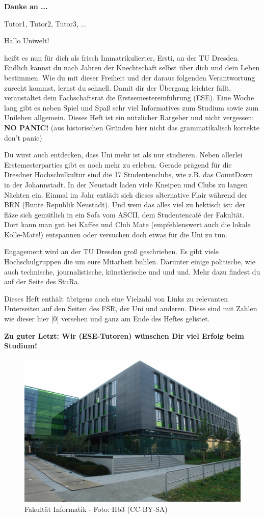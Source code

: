 \textbf{Danke an ...}

Tutor1, Tutor2, Tutor3, ...



Hallo Uniwelt!

heißt es nun für dich als frisch Immatrikulierter, Ersti, an der TU Dresden. 
Endlich kannst du nach Jahren der Knechtschaft selbst über dich und dein Leben bestimmen. 
Wie du mit dieser Freiheit und der daraus folgenden Verantwortung zurecht kommst, lernst du schnell. 
Damit dir der Übergang leichter fällt, veranstaltet dein Fachschaftsrat die Erstsemestereinführung (ESE). 
Eine Woche lang gibt es neben Spiel und Spaß sehr viel Informatives zum Studium sowie zum Unileben allgemein. 
Dieses Heft ist ein nützlicher Ratgeber und nicht vergessen: 
\textbf{NO PANIC!} (aus historischen Gründen hier nicht das grammatikalisch korrekte \glqq don't panic\grqq)

Du wirst auch entdecken, dass Uni mehr ist als nur studieren. 
Neben allerlei Erstemesterparties gibt es noch mehr zu erleben. 
Gerade prägend für die Dresdner Hochschulkultur sind die 17 Studentenclubs, wie z.B. das CountDown in der Johannstadt. 
In der Neustadt laden viele Kneipen und Clubs zu langen Nächten ein. 
Einmal im Jahr entlädt sich dieses alternative Flair während der BRN (Bunte Republik Neustadt). 
Und wem das alles viel zu hektisch ist: der fläze sich gemütlich in ein Sofa vom ASCII, dem Studentencafé der Fakultät. 
Dort kann man gut bei Kaffee und Club Mate (empfehlenswert auch die lokale Kolle-Mate!) entspannen oder versuchen doch etwas für die Uni zu tun.

Engagement wird an der TU Dresden groß geschrieben. 
Es gibt viele Hochschulgruppen die um eure Mitarbeit buhlen. 
Darunter einige politische, wie auch technische, journalistische, künstlerische und und und. Mehr dazu findest du auf der Seite des StuRa.

Dieses Heft enthält übrigens auch eine Vielzahl von Links zu relevanten Unterseiten auf den Seiten des FSR, der Uni und anderen. 
Diese sind mit Zahlen wie dieser hier [0] versehen und ganz am Ende des Heftes gelistet.

\textbf{Zu guter Letzt: Wir (ESE-Tutoren) wünschen Dir viel Erfolg beim Studium!}

\begin{figure}
\centering \includegraphics[width=\linewidth]{img/fakultaet.jpg}
\caption*{{\small Fakultät Informatik - Foto: Hb3 (CC-BY-SA)}}
\end{figure}
